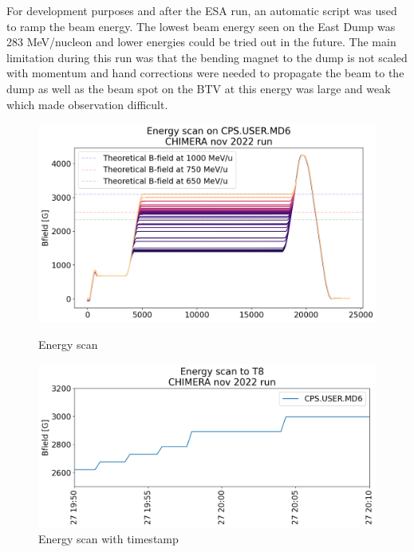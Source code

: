 For development purposes and after the ESA run, an automatic script was used to ramp the beam energy. The lowest beam energy seen on the East Dump was 283 MeV/nucleon and lower energies could be tried out in the future. The main limitation during this run was that the bending magnet to the dump is not scaled with momentum and hand corrections were needed to propagate the beam to the dump as well as the beam spot on the BTV at this energy was large and weak which made observation difficult.


\begin{figure}
    \centering
    \begin{minipage}{0.45\textwidth}
        \centering
        \includegraphics[width=1.0\textwidth]{images/energy_scan_chimera 1.png}
        \caption{Energy scan}
        \label{fig:energy_scan}
    \end{minipage}\hfill
    \begin{minipage}{0.45\textwidth}
        \centering
        \includegraphics[width=1.0\textwidth]{images/energy_scan_timestamp_chimera 1.png} 
        \caption{Energy scan with timestamp}
        \label{fig:energy_scan_timestamp}
    \end{minipage}
\end{figure}

